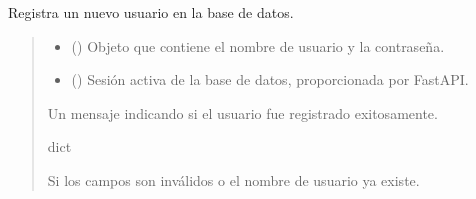 \documentclass[letterpaper,10pt,spanish]{sphinxmanual}
\begin{document}
\begin{fulllineitems}
\label{\detokenize{endpoints:main.register}}
\pysigstartsignatures
\pysiglinewithargsret
{}
{\sphinxparamcomma {}}
{}
\pysigstopsignatures
\sphinxAtStartPar
Registra un nuevo usuario en la base de datos.
\begin{quote}\begin{description}
\begin{itemize}
\item {} 
\sphinxAtStartPar
{} ({\hyperref[\detokenize{modelos:main.UsuarioRegistro}]{}}) \textendash{} Objeto que contiene el nombre de usuario y la contraseña.

\item {} 
\sphinxAtStartPar
{} () \textendash{} Sesión activa de la base de datos, proporcionada por FastAPI.

\end{itemize}

\sphinxAtStartPar
Un mensaje indicando si el usuario fue registrado exitosamente.

\sphinxAtStartPar
dict

\sphinxAtStartPar
{} \textendash{} Si los campos son inválidos o el nombre de usuario ya existe.

\end{description}\end{quote}

\end{fulllineitems}

\end{document}
